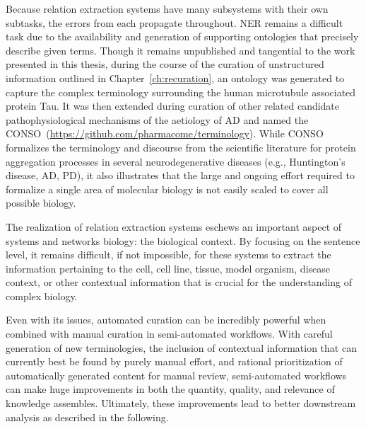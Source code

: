 Because relation extraction systems have many subsystems with their own subtasks, the errors from each propagate throughout.
\ac{NER} remains a difficult task due to the availability and generation of supporting ontologies that precisely describe given terms.
Though it remains unpublished and tangential to the work presented in this thesis, during the course of the curation of unstructured information outlined in Chapter~\ref{ch:recuration}, an ontology was generated to capture the complex terminology surrounding the human microtubule associated protein Tau.
It was then extended during curation of other related candidate pathophysiological mechanisms of the aetiology of \ac{AD} and named the \ac{CONSO}~(\url{https://github.com/pharmacome/terminology}).
While \ac{CONSO} formalizes the terminology and discourse from the scientific literature for protein aggregation processes in several neurodegenerative diseases (e.g., Huntington's disease, \ac{AD}, \ac{PD}), it also illustrates that the large and ongoing effort required to formalize a single area of molecular biology is not easily scaled to cover all possible biology.

The realization of relation extraction systems eschews an important aspect of systems and networks biology: the biological context.
By focusing on the sentence level, it remains difficult, if not impossible, for these systems to extract the information pertaining to the cell, cell line, tissue, model organism, disease context, or other contextual information that is crucial for the understanding of complex biology.

Even with its issues, automated curation can be incredibly powerful when combined with manual curation in semi-automated workflows.
With careful generation of new terminologies, the inclusion of contextual information that can currently best be found by purely manual effort, and rational prioritization of automatically generated content for manual review, semi-automated workflows can make huge improvements in both the quantity, quality, and relevance of knowledge assembles.
Ultimately, these improvements lead to better downstream analysis as described in the following.
